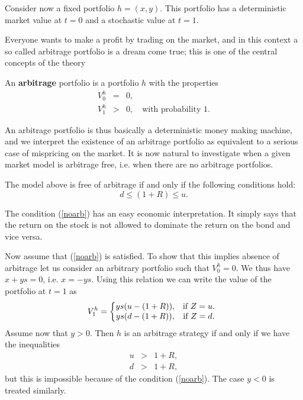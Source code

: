 \documentclass{Base}
\begin{document}
Consider now a fixed portfolio $h=(x,y)$. This portfolio has a deterministic
market value at $t=0$ and a stochastic value at $t=1$.

Everyone wants to make a profit by trading on the market, and in this
context a so called arbitrage portfolio is a dream come true; this is one
of the central concepts of the theory

\begin{definition}
An {\bf arbitrage} portfolio is a portfolio $h$ with the properties
\begin{eqnarray}
V_0^h&=&0,\\
V_1^h&>&0,\quad\mbox{with probability }1.
\end{eqnarray}
\end{definition}

 An arbitrage portfolio is thus basically a
deterministic money making machine, and we interpret the existence
of an arbitrage portfolio as equivalent to a serious case of
mispricing on the market. It is now natural to investigate when a
given market model is arbitrage free, i.e. when there are no
arbitrage portfolios.

\begin{proposition}
The model above is free of arbitrage if and only if the following conditions
hold:
\begin{equation}\label{noarb}
d \leq (1+R) \leq u.
\end{equation}
\end{proposition}


The condition (\ref{noarb}) has an easy economic interpretation. It simply
says that the return on the stock is not allowed to dominate the return on
the bond and vice versa.

Now assume that (\ref{noarb}) is satisfied. To show that this
implies absence of arbitrage let us consider an arbitrary
portfolio such that $V_0^h=0$. We thus have $x+ys=0$, i.e.
$x=-ys$. Using this relation we can write the value of the
portfolio at $t=1$ as
\begin{equation*}
V_1^h= \left\{\begin{array}{@{}c@{}c}
ys(u-(1+R)),&\quad \mbox{if }Z=u.\\
ys(d-(1+R)), &\quad \mbox{if }Z=d.
\end{array}
\right.
\end{equation*}
Assume now that $y>0$. Then $h$ is an arbitrage strategy if and only if we
have the inequalities
\begin{eqnarray}
u&>&1+R,\\
d&>&1+R,
\end{eqnarray}
but this is impossible because of the condition (\ref{noarb}). The case $y<0$ is treated similarly. \endproof
\end{document}
